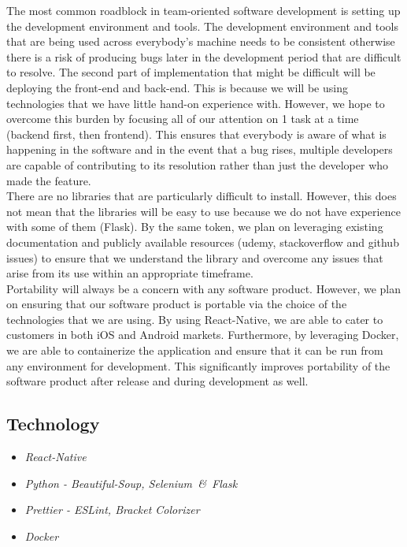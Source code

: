 \documentclass[11pt, oneside]{article}   	%
\begin{document}
The most common roadblock in team-oriented software development is setting up the development environment and tools. The development environment and tools that are being used across everybody's machine needs to be consistent otherwise there is a risk of producing bugs later in the development period that are difficult to resolve.
The second part of implementation that might be difficult will be deploying the front-end and back-end. This is because we will be using technologies that we have little hand-on experience with. However, we hope to overcome this burden by focusing all of our attention on 1 task at a time (backend first, then frontend). This ensures that everybody is aware of what is happening in the software and in the event that a bug rises, multiple developers are capable of contributing to its resolution rather than just the developer who made the feature.\\

There are no libraries that are particularly difficult to install. However, this does not mean that the libraries will be easy to use because we do not have experience with some of them (Flask). By the same token, we plan on leveraging existing documentation and publicly available resources (udemy, stackoverflow and github issues) to ensure that we understand the library and overcome any issues that arise from its use within an appropriate timeframe.\\

Portability will always be a concern with any software product. However, we plan on ensuring that our software product is portable via the choice of the technologies that we are using. By using React-Native, we are able to cater to customers in both iOS and Android markets. Furthermore, by leveraging Docker, we are able to containerize the application and ensure that it can be run from any environment for development. This significantly improves portability of the software product after release and during development as well.\\

\newpage
\subsection*{Technology}

\begin{itemize}
\item \it React-Native
\item \it Python - Beautiful-Soup, Selenium\ \&\ Flask
\item \it Prettier - ESLint, Bracket Colorizer
\item \it Docker
\end{itemize}
\end{document}
